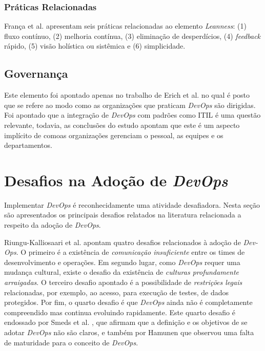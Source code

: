 \subsubsection{Práticas Relacionadas}
França et al. \cite{characterizing_devops} apresentam seis práticas
relacionadas ao elemento \textit{Leanness}: (1) fluxo contínuo, (2) melhoria
contínua, (3) eliminação de desperdícios, (4) \textit{feedback} rápido, (5)
visão holística ou sistêmica e (6) simplicidade.

\subsection{Governança}
Este elemento foi apontado apenas no trabalho de Erich et al. \cite{qualitative_devops_journalsw_17}
no qual é posto que se refere ao modo como as organizações que praticam {\it DevOps}
são dirigidas. Foi apontado que a integração de {\it DevOps} com padrões como
ITIL é uma questão relevante, todavia, as conclusões do estudo apontam que este
é um aspecto implícito de comoas organizações gerenciam o pessoal, as equipes e
os departamentos.

\section{Desafios na Adoção de \textit{DevOps}}\label{secao_desafios}

Implementar \textit{DevOps} é reconhecidamente uma atividade desafiadora. Nesta
seção são apresentados os principais desafios relatados na literatura
relacionada a respeito da adoção de \textit{DevOps}.

Riungu-Kalliosaari et al. \cite{devops_benefits_challenges} apontam quatro
desafios relacionados à adoção de \textit{Dev-Ops}. O primeiro é a existência
de \emph{comunicação insuficiente} entre os times de desenvolvimento e
operações. Em segundo lugar, como \textit{DevOps} requer
uma mudança cultural, existe o desafio da existência de \emph{culturas
profundamente arraigadas}. O terceiro desafio apontado é a possibilidade de
\emph{restrições legais} relacionadas, por exemplo, ao acesso, para execução de
testes, de dados protegidos. Por fim, o quarto desafio é que \textit{DevOps}
ainda não é completamente compreendido mas continua evoluindo rapidamente. Este
quarto desafio é endossado por Smeds et al. \cite{devops_a_definition}, que
afirmam que a definição e os objetivos de se adotar {\it DevOps} não são claros,
e também por Hamunen \cite{challenges_in_adopting_devops} que observou uma
falta de maturidade para o conceito de {\it DevOps}.

